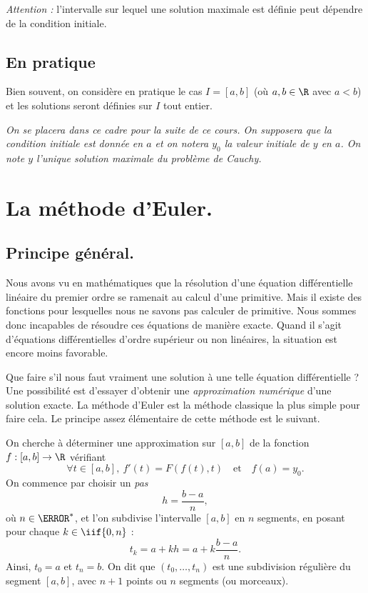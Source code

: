 \emph{Attention :} l'intervalle sur lequel une solution maximale est définie peut dépendre de
la condition initiale.

\subsection{En pratique}

Bien souvent, on considère en pratique le cas $I=[a,b]$ (où $a,b\in\R$ avec $a<b$) et les
solutions seront définies sur $I$ tout entier.

\emph{On se placera dans ce cadre pour la suite de ce cours.
On supposera que la condition initiale est donnée en $a$ et on notera
$y_{0}$ la valeur initiale de $y$ en $a$.
On note $y$ l'unique solution maximale du problème de Cauchy.}

\section{La méthode d'Euler.}

\subsection{Principe général.}

Nous avons vu en mathématiques que la résolution d'une équation différentielle linéaire du premier 
ordre se ramenait au calcul d'une primitive. Mais il existe des fonctions pour lesquelles nous ne 
savons pas calculer de primitive. Nous sommes donc incapables de résoudre ces équations de manière 
exacte. Quand il s'agit d'équations différentielles d'ordre supérieur ou non linéaires, la 
situation est encore moins favorable.

\clearslide{}

Que faire s'il nous faut vraiment une solution à une telle équation différentielle ? Une 
possibilité est d'essayer d'obtenir une \emph{approximation numérique} d'une solution exacte. La 
méthode d'Euler est la méthode classique la plus simple pour faire cela. Le principe assez 
élémentaire de cette méthode est le suivant.

\clearslide{}

On cherche à déterminer une approximation sur $[a,b]$ de la fonction $f : [a,b] \to \R$ vérifiant 
\begin{equation*}
  \forall t \in [a,b],~ f'(t) = F(f(t),t) \quad\textrm{et}\quad f(a) = y_0. 
\end{equation*}
On commence par choisir un \emph{pas} 
\begin{equation*}
  h=\frac{b-a}{n},
\end{equation*}
où $n\in\N^{*}$, et l'on subdivise l'intervalle $[a,b]$ en $n$ segments, en posant pour chaque $k\in \iif{0,n}$ :
\begin{equation*}
  t_{k} = a + k h = a + k \dfrac{b-a}{n}. 
\end{equation*}
Ainsi, $t_0 = a$ et $t_n = b$. On dit que $(t_0,\dots,t_n)$ est une subdivision régulière du segment $[a,b]$, avec $n+1$ points ou $n$ segments (ou morceaux). 

